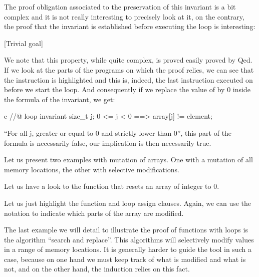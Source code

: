 The proof obligation associated to the preservation of this invariant is
a bit complex and it is not really interesting to precisely look at it,
on the contrary, the proof that the invariant is established before
executing the loop is interesting:



[Trivial goal]


We note that this property, while quite complex, is proved easily proved
by Qed. If we look at the parts of the programs on which the proof
relies, we can see that the instruction  is highlighted
and this is, indeed, the last instruction executed on  before
we start the loop. And consequently if we replace the value of
 by 0 inside the formula of the invariant, we get:



\begin{CodeBlock}{c}
//@ loop invariant \forall size_t j; 0 <= j < 0 ==> array[j] != element;
\end{CodeBlock}



``For all j, greater or equal to 0 and strictly lower than 0'', this
part of the formula is necessarily false, our implication is then
necessarily true.





Let us present two examples with mutation of arrays. One with a mutation
of all memory locations, the other with selective modifications.





Let us have a look to the function that resets an array of integer to 0.






Let us just highlight the function and loop assign clauses. Again, we
can use the notation  to indicate which parts of the
array are modified.





The last example we will detail to illustrate the proof of functions
with loops is the algorithm ``search and replace''. This algorithms will
selectively modify values in a range of memory locations. It is
generally harder to guide the tool in such a case, because on one hand
we must keep track of what is modified and what is not, and on the other
hand, the induction relies on this fact.

